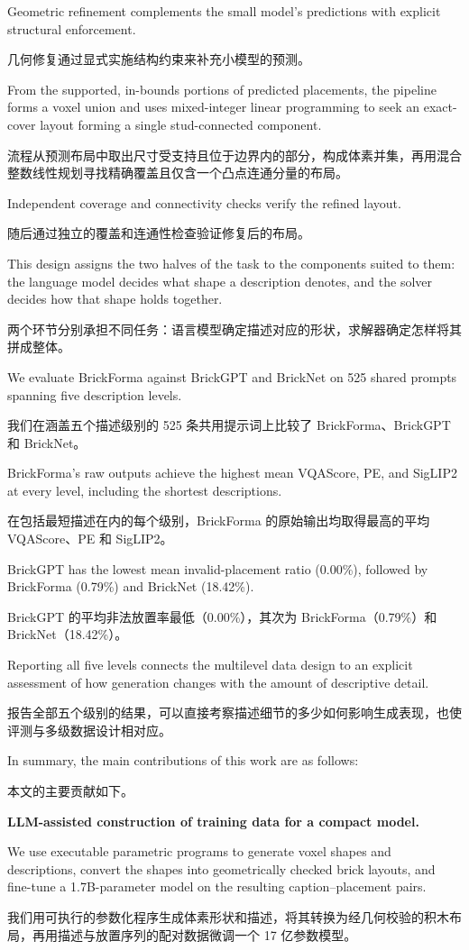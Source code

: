 \documentclass[11pt,letterpaper]{article}
\newcommand{\zh}[1]{{\chinesefont #1}}
\newcommand{\pair}[2]{\par\addvspace{4pt}\noindent
  \begin{minipage}{\linewidth}\raggedright
  #1\par\nobreak\vspace{1pt}
  {\color{translation}\chinesefont\fontsize{10.5}{15.3}\selectfont #2\par}
  \end{minipage}\par}
\newcommand{\readinghead}[2]{\par\addvspace{9pt}\noindent\textbf{#1}\enspace
  {\color{translation}\zh{#2}}\par\nobreak}
\begin{document}
\pair{Geometric refinement complements the small model's predictions with explicit structural enforcement.}{几何修复通过显式实施结构约束来补充小模型的预测。}

\pair{From the supported, in-bounds portions of predicted placements, the pipeline forms a voxel union and uses mixed-integer linear programming to seek an exact-cover layout forming a single stud-connected component.}{流程从预测布局中取出尺寸受支持且位于边界内的部分，构成体素并集，再用混合整数线性规划寻找精确覆盖且仅含一个凸点连通分量的布局。}

\pair{Independent coverage and connectivity checks verify the refined layout.}{随后通过独立的覆盖和连通性检查验证修复后的布局。}

\pair{This design assigns the two halves of the task to the components suited to them: the language model decides what shape a description denotes, and the solver decides how that shape holds together.}{两个环节分别承担不同任务：语言模型确定描述对应的形状，求解器确定怎样将其拼成整体。}

\pair{We evaluate BrickForma against BrickGPT and BrickNet on 525 shared prompts spanning five description levels.}{我们在涵盖五个描述级别的 525 条共用提示词上比较了 BrickForma、BrickGPT 和 BrickNet。}

\pair{BrickForma's raw outputs achieve the highest mean VQAScore, PE, and SigLIP2 at every level, including the shortest descriptions.}{在包括最短描述在内的每个级别，BrickForma 的原始输出均取得最高的平均 VQAScore、PE 和 SigLIP2。}

\pair{BrickGPT has the lowest mean invalid-placement ratio (0.00\%), followed by BrickForma (0.79\%) and BrickNet (18.42\%).}{BrickGPT 的平均非法放置率最低（0.00\%），其次为 BrickForma（0.79\%）和 BrickNet（18.42\%）。}

\pair{Reporting all five levels connects the multilevel data design to an explicit assessment of how generation changes with the amount of descriptive detail.}{报告全部五个级别的结果，可以直接考察描述细节的多少如何影响生成表现，也使评测与多级数据设计相对应。}

\pair{In summary, the main contributions of this work are as follows:}{本文的主要贡献如下。}

\readinghead{LLM-assisted construction of training data for a compact model.}{在大语言模型辅助下为小模型构建训练数据。}

\pair{We use executable parametric programs to generate voxel shapes and descriptions, convert the shapes into geometrically checked brick layouts, and fine-tune a 1.7B-parameter model on the resulting caption--placement pairs.}{我们用可执行的参数化程序生成体素形状和描述，将其转换为经几何校验的积木布局，再用描述与放置序列的配对数据微调一个 17 亿参数模型。}
\end{document}
